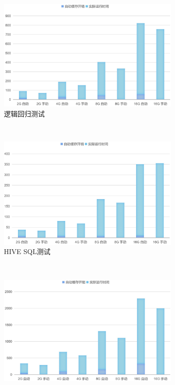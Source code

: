 \begin{figure}[!htbp]
    \centering
    \begin{subfigure}[b]{0.45\linewidth}
      \includegraphics[width=\textwidth]{Img/lr-auto-cache.jpg}
      \caption{逻辑回归测试}
      \label{fig:lr-auto-cache}
    \end{subfigure}%
    ~%
    \begin{subfigure}[b]{0.45\linewidth}
      \includegraphics[width=\textwidth]{Img/hive-auto-cache.jpg}
      \caption{HIVE SQL测试}
      \label{fig:hive-auto-cache}
    \end{subfigure}
    \\%
    \begin{subfigure}[b]{0.45\linewidth}
      \includegraphics[width=\textwidth]{Img/pagerank-auto-cache.jpg}

\end{subfigure}
\end{figure}
